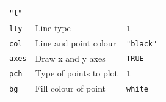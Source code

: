 \documentclass[12pt,]{book}
\theoremstyle{definition}
\theoremstyle{definition}
\theoremstyle{definition}
\theoremstyle{remark}
\begin{document}
\begin{longtable}[]{@{}lll@{}}
\begin{minipage}[t]{0.39\columnwidth}
\texttt{"l"}\strut
\end{minipage}\tabularnewline
\begin{minipage}[t]{0.15\columnwidth}\raggedright
\texttt{lty}\strut
\end{minipage} & \begin{minipage}[t]{0.32\columnwidth}\raggedright
Line type\strut
\end{minipage} & \begin{minipage}[t]{0.39\columnwidth}\raggedright
\texttt{1}\strut
\end{minipage}\tabularnewline
\begin{minipage}[t]{0.15\columnwidth}\raggedright
\texttt{col}\strut
\end{minipage} & \begin{minipage}[t]{0.32\columnwidth}\raggedright
Line and point colour\strut
\end{minipage} & \begin{minipage}[t]{0.39\columnwidth}\raggedright
\texttt{"black"}\strut
\end{minipage}\tabularnewline
\begin{minipage}[t]{0.15\columnwidth}\raggedright
\texttt{axes}\strut
\end{minipage} & \begin{minipage}[t]{0.32\columnwidth}\raggedright
Draw x and y axes\strut
\end{minipage} & \begin{minipage}[t]{0.39\columnwidth}\raggedright
\texttt{TRUE}\strut
\end{minipage}\tabularnewline
\begin{minipage}[t]{0.15\columnwidth}\raggedright
\texttt{pch}\strut
\end{minipage} & \begin{minipage}[t]{0.32\columnwidth}\raggedright
Type of points to plot\strut
\end{minipage} & \begin{minipage}[t]{0.39\columnwidth}\raggedright
\texttt{1}\strut
\end{minipage}\tabularnewline
\begin{minipage}[t]{0.15\columnwidth}\raggedright
\texttt{bg}\strut
\end{minipage} & \begin{minipage}[t]{0.32\columnwidth}\raggedright
Fill colour of point\strut
\end{minipage} & \begin{minipage}[t]{0.39\columnwidth}\raggedright
\texttt{white}\strut
\end{minipage}\tabularnewline
\bottomrule
\end{longtable}
\end{document}

